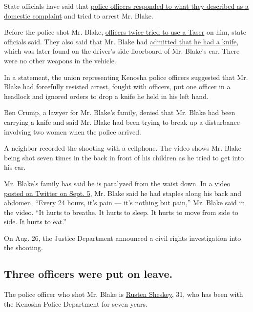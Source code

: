 State officials have said that
\href{https://www.nytimes3xbfgragh.onion/2020/08/26/us/kenosha-shooting-protests-jacob-blake.html}{police
officers responded to what they described as a domestic complaint} and
tried to arrest Mr. Blake.

Before the police shot Mr. Blake,
\href{https://www.nytimes3xbfgragh.onion/2020/08/28/us/jacob-blake-shackles-assault.html}{officers
twice tried to use a Taser} on him, state officials said. They also said
that Mr. Blake had
\href{https://www.nytimes3xbfgragh.onion/2020/08/26/us/kenosha-shooting-protests-jacob-blake.html}{admitted
that he had a knife}, which was later found on the driver's side
floorboard of Mr. Blake's car. There were no other weapons in the
vehicle.

In a statement, the union representing Kenosha police officers suggested
that Mr. Blake had forcefully resisted arrest, fought with officers, put
one officer in a headlock and ignored orders to drop a knife he held in
his left hand.

Ben Crump, a lawyer for Mr. Blake's family, denied that Mr. Blake had
been carrying a knife and said Mr. Blake had been trying to break up a
disturbance involving two women when the police arrived.

A neighbor recorded the shooting with a cellphone. The video shows Mr.
Blake being shot seven times in the back in front of his children as he
tried to get into his car.

Mr. Blake's family has said he is paralyzed from the waist down. In a
\href{https://twitter.com/GHOGM/status/1302314554278412288?s=20}{video
posted on Twitter on Sept. 5}, Mr. Blake said he had staples along his
back and abdomen. ``Every 24 hours, it's pain --- it's nothing but
pain,'' Mr. Blake said in the video. ``It hurts to breathe. It hurts to
sleep. It hurts to move from side to side. It hurts to eat.''

On Aug. 26, the Justice Department announced a civil rights
investigation into the shooting.

\hypertarget{three-officers-were-put-on-leave}{%
\subsection{Three officers were put on
leave.}\label{three-officers-were-put-on-leave}}

The police officer who shot Mr. Blake is
\href{https://www.nytimes3xbfgragh.onion/2020/08/27/us/kenosha-police-officer-rusten-sheskey.html}{Rusten
Sheskey}, 31, who has been with the Kenosha Police Department for seven
years.

